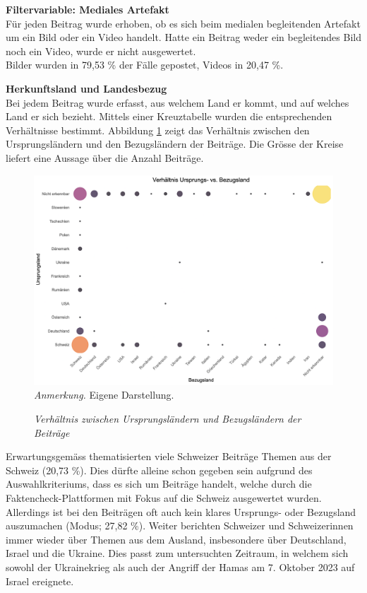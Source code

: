 \documentclass[12pt,a4paper]{article}        %
\begin{document}
\textbf{Filtervariable: Mediales Artefakt}\\
Für jeden Beitrag wurde erhoben, ob es sich beim medialen begleitenden Artefakt um ein Bild oder ein Video handelt. Hatte ein Beitrag weder ein begleitendes Bild noch ein Video, wurde er nicht ausgewertet. \\
Bilder wurden in 79,53 \% der Fälle gepostet, Videos in 20,47 \%.

\pagebreak
\textbf{Herkunftsland und Landesbezug}\\
Bei jedem Beitrag wurde erfasst, aus welchem Land er kommt, und auf welches Land er sich bezieht. Mittels einer Kreuztabelle wurden die entsprechenden Verhältnisse bestimmt. Abbildung \ref{fig:results_country_relation} zeigt das Verhältnis zwischen den Ursprungsländern und den Bezugsländern der Beiträge. Die Grösse der Kreise liefert eine Aussage über die Anzahl Beiträge.
\begin{figure}[H]
  \caption{\textit{Verhältnis zwischen Ursprungsländern und Bezugsländern der Beiträge}}
  \label{fig:results_country_relation}
  \centering
  \includegraphics[width=1\linewidth]{images/country_relation_plot.png}
  \footnotesize\textit{Anmerkung.} Eigene Darstellung.
\end{figure}

Erwartungsgemäss thematisierten viele Schweizer Beiträge Themen aus der Schweiz (20,73 \%). Dies dürfte alleine schon gegeben sein aufgrund des Auswahlkriteriums, dass es sich um Beiträge handelt, welche durch die Faktencheck-Plattformen mit Fokus auf die Schweiz ausgewertet wurden. Allerdings ist bei den Beiträgen oft auch kein klares Ursprungs- oder Bezugsland auszumachen (Modus; 27,82 \%). Weiter berichten Schweizer und Schweizerinnen immer wieder über Themen aus dem Ausland, insbesondere über Deutschland, Israel und die Ukraine. Dies passt zum untersuchten Zeitraum, in welchem sich sowohl der Ukrainekrieg als auch der Angriff der Hamas am 7. Oktober 2023 auf Israel ereignete.\\
\end{document}
